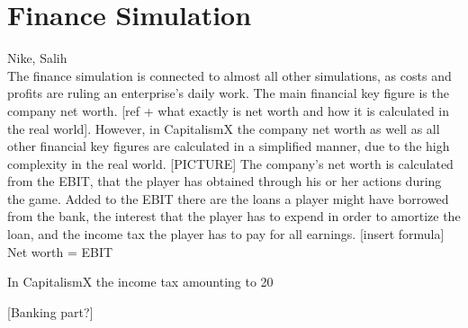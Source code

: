 \section{Finance Simulation}
\label{sec:diag}
Nike, Salih\\
The finance simulation is connected to almost all other simulations, as costs and profits are ruling an enterprise's daily work. The main financial key figure is the company net worth. [ref + what exactly is net worth and how it is calculated in the real world]. However, in CapitalismX the company net worth as well as all other financial key figures are calculated in a simplified manner, due to the high complexity in the real world. 
[PICTURE]
The company’s net worth is calculated from the EBIT, that the player has obtained through his or her actions during the game. Added to the EBIT there are the loans a player might have borrowed from the bank, the interest that the player has to expend in order to amortize the loan, and the income tax the player has to pay for all earnings. [insert formula]
Net worth = EBIT 

In CapitalismX the income tax amounting to 20%

[Banking part?]

